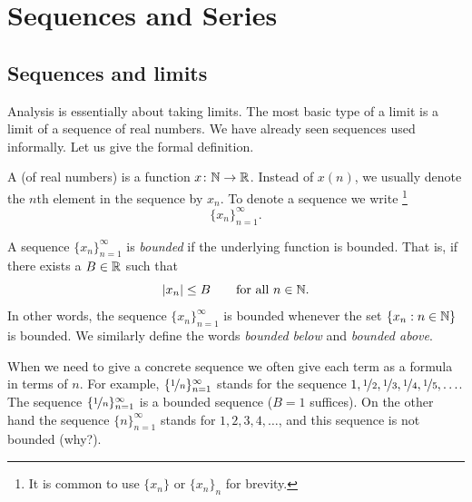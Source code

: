 \chapter{Sequences and Series} \label{seq:chapter}


\section{Sequences and limits}
\label{sec:seqsandlims}


Analysis is essentially about taking limits.  The most basic type of a limit
is a limit of a sequence of real numbers.
We have already seen sequences used informally.  Let us give the formal
definition.

\begin{defn}
A \emph{} (of real numbers) is a function $x \colon {\mathbb{N}} \to
{\mathbb{R}}$.  Instead of $x(n)$, we 
usually denote the $n$th element in the sequence by $x_n$.
To denote a sequence we write%
\footnote{It is common to use $\{ x_n \}$ or $\{ x_n \}_n$ for brevity.}%
%
\begin{equation*}
\{ x_n \}_{n=1}^\infty.
\end{equation*}

A sequence $\{ x_n \}_{n=1}^\infty$ is \emph{bounded} if
the underlying function is bounded.  That is, if
there exists a $B \in {\mathbb{R}}$ such that
\begin{equation*}
\left\lvert {x_n} \right\rvert \leq B \qquad \text{for all } n \in {\mathbb{N}}.
\end{equation*}
In other words, the sequence $\{x_n\}_{n=1}^\infty$ is bounded whenever
the set $\{ x_n : n \in {\mathbb{N}} \}$
is bounded.
We similarly define the words
\emph{bounded below} and
\emph{bounded above}.
\end{defn}

When we need
to give a concrete sequence we often give each term as a formula in
terms of $n$.
For example, $\{ \nicefrac{1}{n} \}_{n=1}^\infty$ stands for
the sequence $1, \nicefrac{1}{2}, \nicefrac{1}{3}, \nicefrac{1}{4},
\nicefrac{1}{5}, \ldots$.
The sequence $\{ \nicefrac{1}{n} \}_{n=1}^\infty$
is a bounded sequence ($B=1$ suffices).  On the other hand the sequence
$\{ n \}_{n=1}^\infty$ stands for
$1,2,3,4,\ldots$, and this sequence is not bounded (why?).


